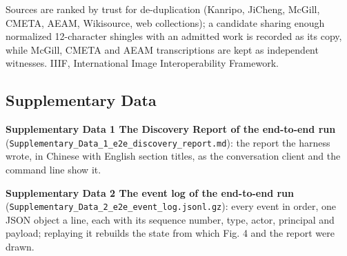 \documentclass[
]{article}
\begin{document}
Sources are ranked by trust for de-duplication (Kanripo, JiCheng,
McGill, CMETA, AEAM, Wikisource, web collections); a candidate sharing
enough normalized 12-character shingles with an admitted work is
recorded as its copy, while McGill, CMETA and AEAM transcriptions are
kept as independent witnesses. IIIF, International Image
Interoperability Framework.

\hypertarget{supplementary-data}{%
\subsection{Supplementary Data}\label{supplementary-data}}

\textbf{Supplementary Data 1 \textbar{} The Discovery Report of the
end-to-end run}
(\texttt{Supplementary\_Data\_1\_e2e\_discovery\_report.md}): the report
the harness wrote, in Chinese with English section titles, as the
conversation client and the command line show it.

\textbf{Supplementary Data 2 \textbar{} The event log of the end-to-end
run} (\texttt{Supplementary\_Data\_2\_e2e\_event\_log.jsonl.gz}): every
event in order, one JSON object a line, each with its sequence number,
type, actor, principal and payload; replaying it rebuilds the state from
which Fig. 4 and the report were drawn.
\end{document}
